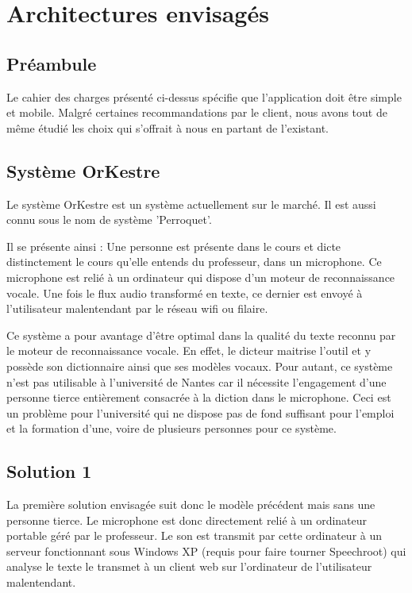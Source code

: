 \chapter{Architectures envisagés}

\section{Préambule}
Le cahier des charges présenté ci-dessus spécifie que l'application doit être
simple et mobile. Malgré certaines recommandations par le client, nous avons
tout de même étudié les choix qui s'offrait à nous en partant de l'existant.

\section{Système OrKestre}

Le système OrKestre est un système actuellement sur le marché. Il est aussi
connu sous le nom de système 'Perroquet'.


Il se présente ainsi : Une personne est présente dans le cours et dicte distinctement le cours qu'elle entends du professeur, dans un microphone. Ce microphone est relié à un ordinateur qui dispose d'un moteur de reconnaissance vocale. Une fois le flux audio transformé en texte, ce dernier est envoyé à l'utilisateur malentendant par le réseau wifi ou filaire.

Ce système a pour avantage d'être optimal dans la qualité du texte reconnu par le moteur de reconnaissance vocale. En effet, le dicteur maitrise l'outil et y possède son dictionnaire ainsi que ses modèles vocaux. 
Pour autant, ce système n'est pas utilisable à l'université de Nantes car il nécessite l'engagement d'une personne tierce entièrement consacrée à la diction dans le microphone. Ceci est un problème pour l'université qui ne dispose pas de fond suffisant pour l'emploi et la formation d'une, voire de plusieurs personnes pour ce système.

\section{Solution 1}


La première solution envisagée suit donc le modèle précédent mais sans une personne tierce.
Le microphone est donc directement relié à un ordinateur portable géré par le professeur.
Le son est transmit par cette ordinateur à un serveur fonctionnant sous Windows XP (requis pour faire tourner Speechroot) qui analyse le texte le transmet à un client web sur l'ordinateur de l'utilisateur malentendant.

